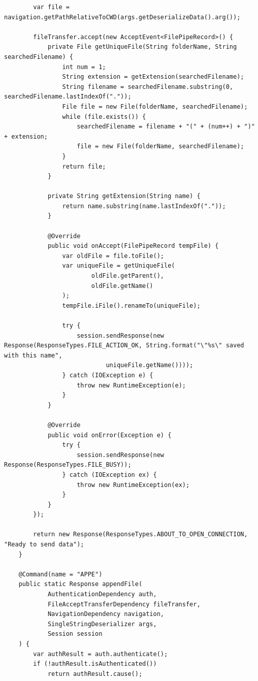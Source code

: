 \documentclass[a4paper,14pt]{extarticle}
\begin{document}
\begin{verbatim}
        var file = navigation.getPathRelativeToCWD(args.getDeserializeData().arg());

        fileTransfer.accept(new AcceptEvent<FilePipeRecord>() {
            private File getUniqueFile(String folderName, String searchedFilename) {
                int num = 1;
                String extension = getExtension(searchedFilename);
                String filename = searchedFilename.substring(0, searchedFilename.lastIndexOf("."));
                File file = new File(folderName, searchedFilename);
                while (file.exists()) {
                    searchedFilename = filename + "(" + (num++) + ")" + extension;
                    file = new File(folderName, searchedFilename);
                }
                return file;
            }

            private String getExtension(String name) {
                return name.substring(name.lastIndexOf("."));
            }

            @Override
            public void onAccept(FilePipeRecord tempFile) {
                var oldFile = file.toFile();
                var uniqueFile = getUniqueFile(
                        oldFile.getParent(),
                        oldFile.getName()
                );
                tempFile.iFile().renameTo(uniqueFile);

                try {
                    session.sendResponse(new Response(ResponseTypes.FILE_ACTION_OK, String.format("\"%s\" saved with this name",
                            uniqueFile.getName())));
                } catch (IOException e) {
                    throw new RuntimeException(e);
                }
            }

            @Override
            public void onError(Exception e) {
                try {
                    session.sendResponse(new Response(ResponseTypes.FILE_BUSY));
                } catch (IOException ex) {
                    throw new RuntimeException(ex);
                }
            }
        });

        return new Response(ResponseTypes.ABOUT_TO_OPEN_CONNECTION, "Ready to send data");
    }

    @Command(name = "APPE")
    public static Response appendFile(
            AuthenticationDependency auth,
            FileAcceptTransferDependency fileTransfer,
            NavigationDependency navigation,
            SingleStringDeserializer args,
            Session session
    ) {
        var authResult = auth.authenticate();
        if (!authResult.isAuthenticated())
            return authResult.cause();


\end{verbatim}
\end{document}
